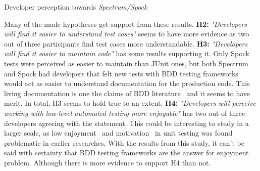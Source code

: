     \begin{table}[H]
            \caption {Developer perception towards \textit{Spectrum/Spock}} \label{tab:changes-pt13}

    \end{table}

Many of the made hypotheses get support from these results.
\textbf{H2:} \textit{"Developers will find it easier to understand test cases"} seems to have more evidence as two out of
three participants find test cases more understandable. \textbf{H3:} \textit{"Developers will find it easier to maintain code"}
has some results supporting it. Only Spock tests were perceived as easier to maintain than JUnit ones, but both Spectrum
and Spock had developers that felt new tests with BDD testing frameworks would act as easier to understand documentation for the
production code. This living documentation is one the claims of BDD literature~\cite{smart2014bdd} and it seems to have
merit. In total, H3 seems to hold true to an extent.
\textbf{H4:} \textit{"Developers will perceive working with low-level automated testing more enjoyable"} has two out
of three developers agreeing with the statement. This could be interesting to study in a larger scale, as low enjoyment~\cite{daka2014survey}
and motivation~\cite{runeson2006survey} in unit testing was found problematic in earlier researches. With the results from
this study, it can't be said with certainty that BDD testing frameworks are the answer for enjoyment problem. Although
there is more evidence to support H4 than not.


